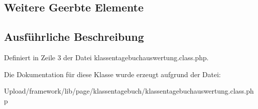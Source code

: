 \subsection*{Weitere Geerbte Elemente}


\subsection{Ausführliche Beschreibung}


Definiert in Zeile 3 der Datei klassentagebuchauswertung.\+class.\+php.



Die Dokumentation für diese Klasse wurde erzeugt aufgrund der Datei\+:\begin{DoxyCompactItemize}
\item 
Upload/framework/lib/page/klassentagebuch/klassentagebuchauswertung.\+class.\+php\end{DoxyCompactItemize}
